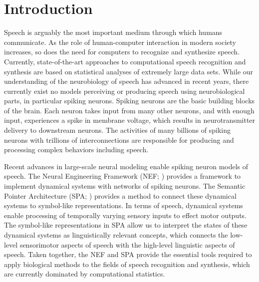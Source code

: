 \chapter{Introduction}

Speech is arguably the most important
medium through which humans communicate.
As the role of human-computer interaction
in modern society increases,
so does the need for computers
to recognize and synthesize speech.
Currently, state-of-the-art approaches
to computational
speech recognition and synthesis
are based on statistical analyses
of extremely large data sets.
While our understanding
of the neurobiology of speech has advanced
in recent years,
there currently exist no
models perceiving or producing speech
using neurobiological parts,
in particular spiking neurons.
Spiking neurons are the basic building blocks
of the brain.
Each neuron takes input from many other neurons,
and with enough input,
experiences a spike in membrane voltage,
which results in neurotransmitter
delivery to downstream neurons.
The activities of many billions
of spiking neurons with trillions
of interconnections are responsible
for producing and processing
complex behaviors including speech.

Recent advances in large-scale neural modeling
enable spiking neuron models of speech.
The Neural Engineering Framework (NEF; \cite{eliasmith2004})
provides a framework to implement
dynamical systems with networks of spiking neurons.
The Semantic Pointer Architecture (SPA; \cite{eliasmith2013})
provides a method to connect these dynamical systems
to symbol-like representations.
In terms of speech,
dynamical systems enable processing of
temporally varying sensory inputs
to effect motor outputs.
The symbol-like representations in SPA
allow us to interpret the states
of these dynamical systems
as linguistically relevant concepts,
which connects the low-level
sensorimotor aspects of speech
with the high-level linguistic aspects of speech.
Taken together, the NEF and SPA
provide the essential tools required
to apply biological methods
to the fields of
speech recognition and synthesis,
which are currently dominated
by computational statistics.

